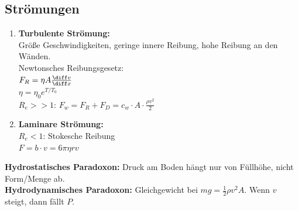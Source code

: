 \documentclass[german]{latex4ei/latex4ei_sheet}
\begin{document}
\begin{sectionbox}
\subsection{Strömungen}
\begin{enumerate}
	\item \textbf{Turbulente Strömung:} \\
		Größe Geschwindigkeiten, geringe innere Reibung, hohe Reibung an den Wänden.\\
			Newtonsches Reibungsgesetz:\\
			$F_R=\eta A \frac{\diff v}{\diff x}$\\
			$\eta=\eta_0e^{T/T_0}$ \\
			$R_e >> 1$: $F_w=F_R+F_D=c_w \cdot A \cdot \frac{\rho v^2}{2}$
	\item \textbf{Laminare Strömung:} \\
			$R_e<1$: Stokesche Reibung\\
			$F=b\cdot v = 6\pi \eta r v$
\end{enumerate}
\textbf{Hydrostatisches Paradoxon:} Druck am Boden hängt nur von Füllhöhe, nicht Form/Menge ab.\\
\textbf{Hydrodynamisches Paradoxon:} Gleichgewicht bei $mg=\frac{1}{2}\rho v^2 A$. Wenn $v$ steigt, dann fällt $P$.
\end{sectionbox}


\end{document}

